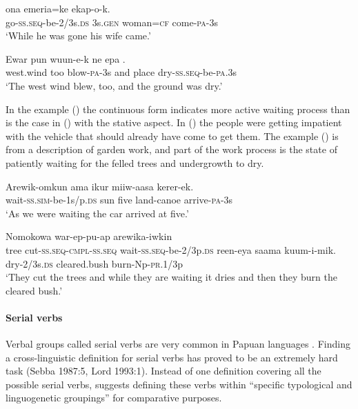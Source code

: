 \ea%
\label{ex:x358}
\gll {} ona emeria=ke ekap-o-k. \\
go-\textsc{ss}.\textsc{seq}-be-2/3s.\textsc{ds} 3s.\textsc{gen} woman=\textsc{cf} come-\textsc{pa}-3s\\
\glt`While he was gone his wife came.'
\z

\ea%
\label{ex:x1047}
\gll Ewar pun wuun-e-k ne epa . \\
west.wind too blow-\textsc{pa}-3s and place dry-\textsc{ss}.\textsc{seq}-be-\textsc{pa}.3s\\
\glt`The west wind blew, too, and the ground was dry.'
\z

In the example () the continuous form indicates more active waiting process than is the case in () with the stative aspect. In () the people were getting impatient with the vehicle that should already have come to get them. The example () is from a description of garden work, and part of the work process is the state of patiently waiting for the felled trees and undergrowth to dry. 

\ea%
\label{ex:x359}
\gll Arewik-omkun ama ikur miiw-aasa kerer-ek. \\
wait-\textsc{ss}.\textsc{sim}-be-1s/p.\textsc{ds} sun five land-canoe arrive-\textsc{pa}-3s\\
\glt`As we were waiting the car arrived at five.'
\z

\ea%
\label{ex:x360}
\gll Nomokowa war-ep-pu-ap arewika-iwkin \\
tree cut-\textsc{ss}.\textsc{seq}-\textsc{cmpl}-\textsc{ss}.\textsc{seq} wait-\textsc{ss}.\textsc{seq}-be-2/3p.\textsc{ds}
reen-eya saama kuum-i-mik.
dry-2/3s.\textsc{ds} cleared.bush burn-Np-\textsc{pr}.1/3p\\
\glt`They cut the trees and while they are waiting it dries and then they burn the cleared bush.' 
\z

\paragraph[Serial verbs]{Serial verbs} 
{}
Verbal groups called serial verbs are very common in Papuan languages \citep[116]{Foley1986}. Finding a cross-linguistic definition for serial verbs has proved to be an extremely hard task (Sebba 1987:5, Lord 1993:1). Instead of one definition covering all the possible serial verbs, \citet[19]{Crowley2002} suggests defining these verbs within ``{specific typological and linguogenetic groupings}'' for comparative purposes. 

